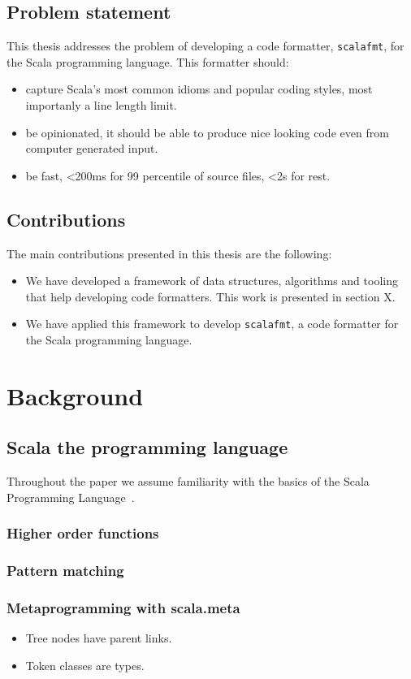 \documentclass[11pt,a4paper]{article}
\begin{document}
\subsection{Problem statement} This thesis addresses the problem of developing a code formatter, \texttt{scalafmt}, for the Scala programming language.
This formatter should:
\begin{itemize}
\item
 capture Scala's most common idioms and popular coding styles, most importanly a line length limit.
\item
 be opinionated, it should be able to produce nice looking code even from computer generated input.
\item
 be fast, <200ms for 99 percentile of source files, <2s for rest.
\end{itemize}

\subsection{Contributions} The main contributions presented in this thesis are the following:
\begin{itemize}
\item
 We have developed a framework of data structures, algorithms and tooling that help developing code formatters.
 This work is presented in section X.
\item
 We have applied this framework to develop \texttt{scalafmt}, a code formatter for the Scala programming language.
\end{itemize}

\section{Background}
\subsection{Scala the programming language}

Throughout the paper we assume familiarity with the basics of the Scala Programming Language~\autocite{odersky_scala_2004}.
\subsubsection{Higher order functions} \subsubsection{Pattern matching} \subsubsection{Metaprogramming with scala.meta}
\begin{itemize}
\item
 Tree nodes have parent links.
\item
 Token classes are types.
\end{itemize}
\end{document}
